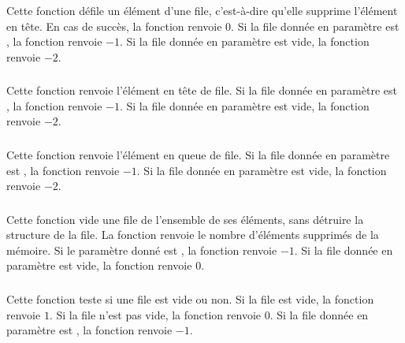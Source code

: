 \subsubsection*{}

\noindent Cette fonction défile un élément d'une file, c'est-à-dire qu'elle supprime l'élément en tête.
En cas de succès, la fonction renvoie $ 0 $.
Si la file donnée en paramètre est , la fonction renvoie $ -1 $.
Si la file donnée en paramètre est vide, la fonction renvoie $ -2 $.


\subsubsection*{}

\noindent Cette fonction renvoie l'élément en tête de file.
Si la file donnée en paramètre est , la fonction renvoie $ -1 $.
Si la file donnée en paramètre est vide, la fonction renvoie $ -2 $.


\subsubsection*{}

\noindent Cette fonction renvoie l'élément en queue de file.
Si la file donnée en paramètre est , la fonction renvoie $ -1 $.
Si la file donnée en paramètre est vide, la fonction renvoie $ -2 $.


\subsubsection*{}

\noindent Cette fonction vide une file de l'ensemble de ses éléments, sans détruire la structure de la file.
La fonction renvoie le nombre d'éléments supprimés de la mémoire.
Si le paramètre donné est , la fonction renvoie $ -1 $.
Si la file donnée en paramètre est vide, la fonction renvoie $ 0 $.


\subsubsection*{}

\noindent Cette fonction teste si une file est vide ou non.
Si la file est vide, la fonction renvoie $ 1 $.
Si la file n'est pas vide, la fonction renvoie $ 0 $.
Si la file donnée en paramètre est , la fonction renvoie $ -1 $.



